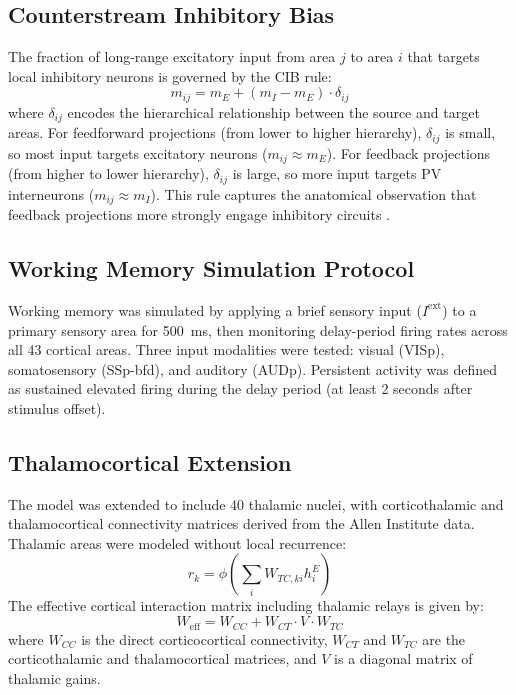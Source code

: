 \documentclass[11pt]{article}
\begin{document}
\subsection{Counterstream Inhibitory Bias}

The fraction of long-range excitatory input from area $j$ to area $i$ that targets local inhibitory neurons is governed by the CIB rule:
\begin{equation}
m_{ij} = m_E + (m_I - m_E) \cdot \delta_{ij}
\end{equation}
where $\delta_{ij}$ encodes the hierarchical relationship between the source and target areas. For feedforward projections (from lower to higher hierarchy), $\delta_{ij}$ is small, so most input targets excitatory neurons ($m_{ij} \approx m_E$). For feedback projections (from higher to lower hierarchy), $\delta_{ij}$ is large, so more input targets PV interneurons ($m_{ij} \approx m_I$). This rule captures the anatomical observation that feedback projections more strongly engage inhibitory circuits \citep{markov2014}.

\subsection{Working Memory Simulation Protocol}

Working memory was simulated by applying a brief sensory input ($I^{\text{ext}}$) to a primary sensory area for 500~ms, then monitoring delay-period firing rates across all 43 cortical areas. Three input modalities were tested: visual (VISp), somatosensory (SSp-bfd), and auditory (AUDp). Persistent activity was defined as sustained elevated firing during the delay period (at least 2 seconds after stimulus offset).

\subsection{Thalamocortical Extension}

The model was extended to include 40 thalamic nuclei, with corticothalamic and thalamocortical connectivity matrices derived from the Allen Institute data. Thalamic areas were modeled without local recurrence:
\begin{equation}
r_k = \phi\left(\sum_i W_{TC,ki} h_i^E\right)
\end{equation}
The effective cortical interaction matrix including thalamic relays is given by:
\begin{equation}
W_{\text{eff}} = W_{CC} + W_{CT} \cdot V \cdot W_{TC}
\end{equation}
where $W_{CC}$ is the direct corticocortical connectivity, $W_{CT}$ and $W_{TC}$ are the corticothalamic and thalamocortical matrices, and $V$ is a diagonal matrix of thalamic gains.
\end{document}
